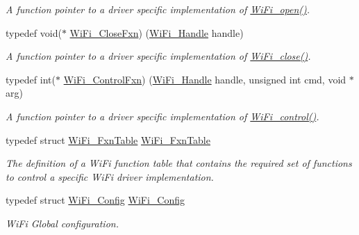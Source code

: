 \begin{DoxyCompactItemize}
\begin{DoxyCompactList}\small\item\em A function pointer to a driver specific implementation of \hyperlink{_wi_fi_8h_a74bfb46543ca040aabea15dc58f16e92}{Wi\+Fi\+\_\+open()}. \end{DoxyCompactList}\item 
typedef void($\ast$ \hyperlink{_wi_fi_8h_a38017ed0e04ba2fb9a81cd3177c7d7b8}{Wi\+Fi\+\_\+\+Close\+Fxn}) (\hyperlink{_wi_fi_8h_a2969512dbfbf2a383ac8c1a9cf01a95c}{Wi\+Fi\+\_\+\+Handle} handle)
\begin{DoxyCompactList}\small\item\em A function pointer to a driver specific implementation of \hyperlink{_wi_fi_8h_a463c68dfbe1ad861adfd073942fcac46}{Wi\+Fi\+\_\+close()}. \end{DoxyCompactList}\item 
typedef int($\ast$ \hyperlink{_wi_fi_8h_a2b33be721c0a64e9d4059f5318cf32f6}{Wi\+Fi\+\_\+\+Control\+Fxn}) (\hyperlink{_wi_fi_8h_a2969512dbfbf2a383ac8c1a9cf01a95c}{Wi\+Fi\+\_\+\+Handle} handle, unsigned int cmd, void $\ast$arg)
\begin{DoxyCompactList}\small\item\em A function pointer to a driver specific implementation of \hyperlink{_wi_fi_8h_a1f42a1e174ed1682b7de43ec6f043bf7}{Wi\+Fi\+\_\+control()}. \end{DoxyCompactList}\item 
typedef struct \hyperlink{struct_wi_fi___fxn_table}{Wi\+Fi\+\_\+\+Fxn\+Table} \hyperlink{_wi_fi_8h_ac9f5dd5ed47beee3ae78f5c3dc110cdb}{Wi\+Fi\+\_\+\+Fxn\+Table}
\begin{DoxyCompactList}\small\item\em The definition of a Wi\+Fi function table that contains the required set of functions to control a specific Wi\+Fi driver implementation. \end{DoxyCompactList}\item 
typedef struct \hyperlink{struct_wi_fi___config}{Wi\+Fi\+\_\+\+Config} \hyperlink{_wi_fi_8h_ac319cd4fddeb63624579ecd4d4275631}{Wi\+Fi\+\_\+\+Config}
\begin{DoxyCompactList}\small\item\em Wi\+Fi Global configuration. \end{DoxyCompactList}\end{DoxyCompactItemize}
